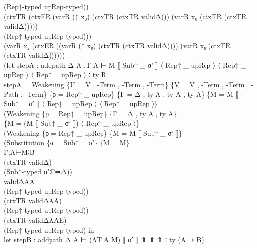 {\begin{code}
{\>                                        (Rep↑-typed upRep-typed)) \<\\
\>                           (ctxTR (ctxER (varR (↑ x₀) (ctxTR (ctxTR validΔ))) (varR x₀ (ctxTR (ctxTR validΔ))))) \<\\
\>                           (Rep↑-typed upRep-typed))) \<\\
\>                           (varR x₂ (ctxER ((varR (↑ x₀) (ctxTR (ctxTR validΔ)))) (varR x₀ (ctxTR (ctxTR validΔ))))))  \<\\
\>                              (let stepA : addpath Δ A ,T A ⊢ M ⟦ Sub↑ \_ σ' ⟧ 〈 Rep↑ \_ upRep 〉 〈 Rep↑ \_ upRep 〉 〈 Rep↑ \_ upRep 〉 ∶ ty B\<\\
\>                                   stepA = Weakening \{U = V , -Term , -Term , -Term\} \{V = V , -Term , -Term , -Path , -Term\} \{ρ = Rep↑ \_ upRep\} \{Γ = Δ , ty A , ty A , ty A\} \{M = M ⟦ Sub↑ \_ σ' ⟧ 〈 Rep↑ \_ upRep 〉 〈 Rep↑ \_ upRep 〉\} \<\\
\>                                      (Weakening \{ρ = Rep↑ \_ upRep\} \{Γ = Δ , ty A , ty A\}\<\\
\>                                         \{M = (M ⟦ Sub↑ \_ σ' ⟧) 〈 Rep↑ \_ upRep 〉\} \<\\
\>                                      (Weakening \{ρ = Rep↑ \_ upRep\} \{M = M ⟦ Sub↑ \_ σ' ⟧\} \<\\
\>                                      (Substitution \{σ = Sub↑ \_ σ'\} \{M = M\} \<\\
\>                                      Γ,A⊢M∶B \<\\
\>                                      (ctxTR validΔ) \<\\
\>                                      (Sub↑-typed σ'∶Γ⇒Δ))\<\\
\>                                      validΔAA \<\\
\>                                      (Rep↑-typed upRep-typed)) \<\\
\>                                      (ctxTR validΔAA) \<\\
\>                                      (Rep↑-typed upRep-typed))\<\\
\>                                      (ctxTR validΔAAE)\<\\
\>                                      (Rep↑-typed upRep-typed) in\<\\
\>                              let stepB : addpath Δ A ⊢ (ΛT A M) ⟦ σ' ⟧ ⇑ ⇑ ⇑ ∶ ty (A ⇛ B)\<\\
}
\end{code}}
